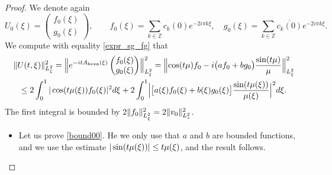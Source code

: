 \documentclass[10pt]{amsart}
\theoremstyle{definition}
\let\dis\relax
\newcommand\Z{\mathbb Z}
\newcommand{\bpac}[1]{\bigl[#1\bigr]}
\newcommand{\Babs}[1]{\Bigl|#1\Bigr|}
\begin{document}
\begin{proof}
We denote again
\[
{U_0}(\xi) = \begin{pmatrix} {f}_0(\xi) \\ {g}_0(\xi)\end{pmatrix}, \qquad {f}_0(\xi) = \sum_{k\in\Z} c_k(0)e^{- 2i\pi k \xi}, \quad {g}_0(\xi) = \sum_{k\in\Z} \overline{c_k(0)}e^{- 2i\pi k \xi}.
\]
We compute with equality \eqref{expr_sg_fg} that
\begin{multline*}
\|{U}(t,\xi)\|_{L^2_\xi}^2 = \Bigl\| e^{-it A_{\mathrm{hexa}}(\xi) }\begin{pmatrix} {f}_0(\xi) \\ {g}_0(\xi) \end{pmatrix} \Bigr\|_{L^2_\xi}^2=\Bigl\| \cos(t\mu){f}_0 -i\bigl(a{f}_0+b{g}_0\bigr)\frac{\sin(t\mu)}{\mu}\Bigr\|_{L^2_\xi}^2 \\
\leq 2\int_0^1 |\cos(t\mu(\xi)){f}_0(\xi)|^2d\xi + 2\int_0^1 \Babs{\bpac{a(\xi){f}_0(\xi)+b(\xi){g}_0(\xi)}\frac{\sin(t\mu(\xi))}{\mu(\xi)}}^2d\xi.
\end{multline*}
The first integral is bounded by $\dis 2\| {f}_0\|_{L^2_\xi}^2 = 2 \|v_0 \|_{L^2_z}^2$. 

\begin{itemize}
\item
Let us prove \eqref{bound00}. He we only use that $a$ and $b$ are bounded functions, and we use the estimate $\dis |\sin(t\mu(\xi))| \leq t\mu(\xi)$, and the result follows. 


\end{itemize}
\end{proof}
\end{document}
